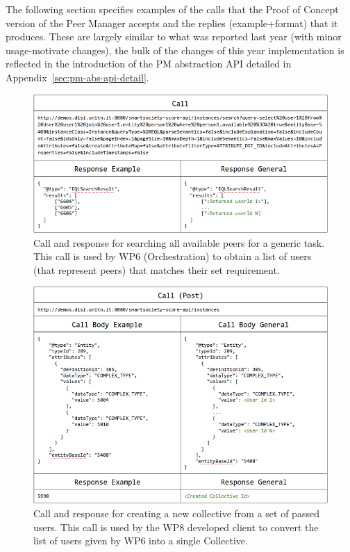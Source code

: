 The following section specifies examples of the calls that the Proof of Concept version of the  Peer Manager accepts and the replies (example+format) that it produces. These are largely similar to what was reported last year (with minor usage-motivate changes), the bulk of the changes of this year implementation is reflected in the introduction of the PM abstraction API detailed in Appendix~\ref{sec:pm-abs-api-detail}.

\begin{figure}[htb!]
\centering
\includegraphics[width=1\linewidth]{figures/Peer-search.png}
\caption{Call and response for searching all available peers for a generic task. This call is used by WP6 (Orchestration) to obtain a list of users (that represent peers) that matches their set requirement.}
\label{fig:Peer-search}
\end{figure}

\begin{figure}[htb!]
\centering
\includegraphics[width=1\linewidth]{figures/Collective-create.png}
\caption{Call and response for creating a new collective from a set of passed users. This call is used by the WP8 developed client to convert the list of users given by WP6 into a single Collective.}
\label{fig:Collective-create}
\end{figure}


